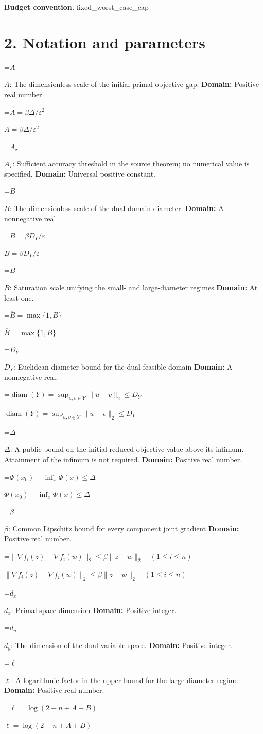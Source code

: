 \documentclass[10pt,a4paper]{article}
\newcommand{\AtlasMath}[1]{\par\begingroup\centering\setbox0=\hbox{$\displaystyle #1$}\ifdim\wd0>1.4\linewidth\typeout{ATLAS WIDE FORMULA: \the\wd0}\fi\ifdim\wd0>\linewidth\resizebox{\linewidth}{!}{\box0}\else\box0\fi\par\endgroup}
\newcommand{\AtlasInlineMath}[1]{\begingroup\setbox0=\hbox{$#1$}\ifdim\wd0>.4\linewidth\endgroup\AtlasMath{#1}\else\endgroup$#1$\fi}
\begin{document}
\textbf{Budget convention.} fixed\_worst\_case\_cap

\section{2. Notation and parameters}
\AtlasInlineMath{A}: The dimensionless scale of the initial primal objective gap. \textbf{Domain:} Positive real number.

\AtlasInlineMath{A=\beta\Delta/\varepsilon^2}

\AtlasInlineMath{A_\star}: Sufficient accuracy threshold in the source theorem; no numerical value is specified. \textbf{Domain:} Universal positive constant.

\AtlasInlineMath{B}: The dimensionless scale of the dual-domain diameter. \textbf{Domain:} A nonnegative real.

\AtlasInlineMath{B=\beta D_Y/\varepsilon}

\AtlasInlineMath{\overline B}: Saturation scale unifying the small- and large-diameter regimes \textbf{Domain:} At least one.

\AtlasInlineMath{\overline B=\max\{1,B\}}

\AtlasInlineMath{D_Y}: Euclidean diameter bound for the dual feasible domain \textbf{Domain:} A nonnegative real.

\AtlasInlineMath{\operatorname{diam}(Y)=\sup_{u,v\in Y}\|u-v\|_2\le D_Y}

\AtlasInlineMath{\Delta}: A public bound on the initial reduced-objective value above its infimum. Attainment of the infimum is not required. \textbf{Domain:} Positive real number.

\AtlasInlineMath{\Phi(x_0)-\inf_x\Phi(x)\le\Delta}

\AtlasInlineMath{\beta}: Common Lipschitz bound for every component joint gradient \textbf{Domain:} Positive real number.

\AtlasInlineMath{\|\nabla f_i(z)-\nabla f_i(w)\|_2\le\beta\|z-w\|_2\quad(1\le i\le n)}

\AtlasInlineMath{d_x}: Primal-space dimension \textbf{Domain:} Positive integer.

\AtlasInlineMath{d_y}: The dimension of the dual-variable space. \textbf{Domain:} Positive integer.

\AtlasInlineMath{\ell}: A logarithmic factor in the upper bound for the large-diameter regime \textbf{Domain:} Positive real number.

\AtlasInlineMath{\ell=\log(2+n+A+B)}
\end{document}
